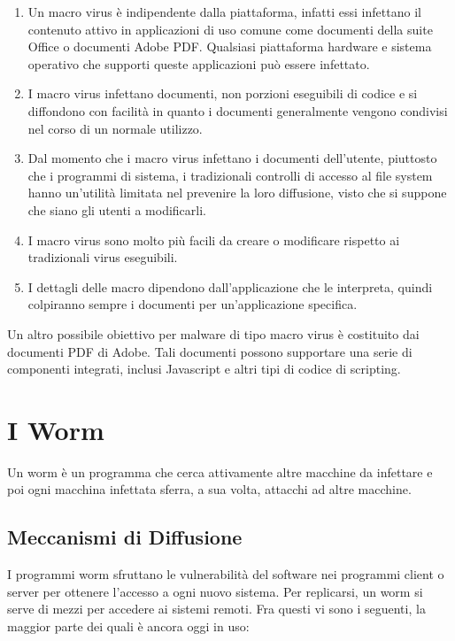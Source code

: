 \begin{enumerate}
    \item Un macro virus è indipendente dalla piattaforma, infatti essi infettano il contenuto attivo in applicazioni di uso comune come documenti della suite Office o documenti Adobe PDF. Qualsiasi piattaforma hardware e sistema operativo che supporti queste applicazioni può essere infettato.
    \item I macro virus infettano documenti, non porzioni eseguibili di codice e si diffondono con facilità in quanto i documenti generalmente vengono condivisi nel corso di un normale utilizzo.
    \item Dal momento che i macro virus infettano i documenti dell'utente, piuttosto che i programmi di sistema, i tradizionali controlli di accesso al file system hanno un'utilità limitata nel prevenire la loro diffusione, visto che si suppone che siano gli utenti a modificarli.
    \item I macro virus sono molto più facili da creare o modificare rispetto ai tradizionali virus eseguibili.
    \item I dettagli delle macro dipendono dall'applicazione che le interpreta, quindi colpiranno sempre i documenti per un'applicazione specifica.
\end{enumerate}

Un altro possibile obiettivo per malware di tipo macro virus è costituito dai documenti PDF di Adobe. Tali documenti possono supportare una serie di componenti integrati, inclusi Javascript e altri tipi di codice di scripting.

\section{I Worm}

Un worm è un programma che cerca attivamente altre macchine da infettare e poi ogni macchina infettata sferra, a sua volta, attacchi ad altre macchine.

\subsection{Meccanismi di Diffusione}

I programmi worm sfruttano le vulnerabilità del software nei programmi client o server per ottenere l'accesso a ogni nuovo sistema. Per replicarsi, un worm si serve di mezzi per accedere ai sistemi remoti. Fra questi vi sono i seguenti, la maggior parte dei quali è ancora oggi in uso:

